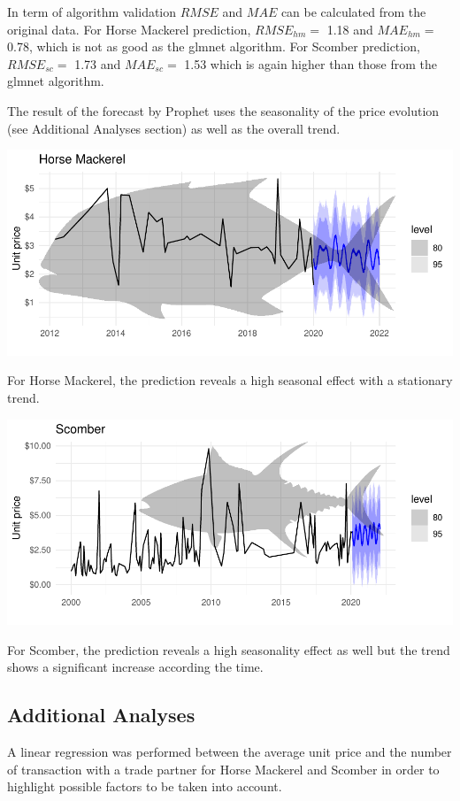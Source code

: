 \documentclass[10,a4paperpaper,]{article}
\begin{document}
In term of algorithm validation \(RMSE\) and \(MAE\) can be calculated
from the original data. For Horse Mackerel prediction, \(RMSE_{hm} =\)
1.18 and \(MAE_{hm} =\) 0.78, which is not as good as the glmnet
algorithm. For Scomber prediction, \(RMSE_{sc} =\) 1.73 and
\(MAE_{sc} =\) 1.53 which is again higher than those from the glmnet
algorithm.

The result of the forecast by Prophet uses the seasonality of the price
evolution (see Additional Analyses section) as well as the overall
trend.

\includegraphics{report_files/figure-latex/unnamed-chunk-21-1.pdf}

For Horse Mackerel, the prediction reveals a high seasonal effect with a
stationary trend.

\includegraphics{report_files/figure-latex/unnamed-chunk-22-1.pdf}

For Scomber, the prediction reveals a high seasonality effect as well
but the trend shows a significant increase according the time.

\subsection{Additional Analyses}

A linear regression was performed between the average unit price and the
number of transaction with a trade partner for Horse Mackerel and
Scomber in order to highlight possible factors to be taken into account.
\end{document}
